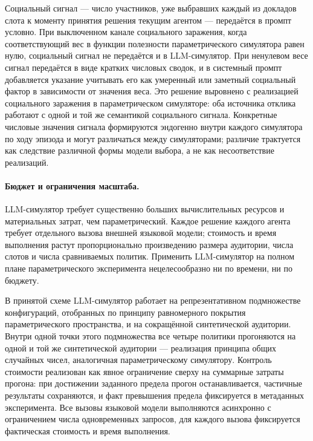 Социальный сигнал --- число участников, уже выбравших каждый из докладов слота к моменту принятия решения текущим агентом --- передаётся в промпт условно. При выключенном канале социального заражения, когда соответствующий вес в функции полезности параметрического симулятора равен нулю, социальный сигнал не передаётся и в LLM-симулятор. При ненулевом весе сигнал передаётся в виде кратких числовых сводок, и в системный промпт добавляется указание учитывать его как умеренный или заметный социальный фактор в зависимости от значения веса. Это решение выровнено с реализацией социального заражения в параметрическом симуляторе: оба источника отклика работают с одной и той же семантикой социального сигнала. Конкретные числовые значения сигнала формируются эндогенно внутри каждого симулятора по ходу эпизода и могут различаться между симуляторами; различие трактуется как следствие различной формы модели выбора, а не как несоответствие реализаций.

\paragraph{Бюджет и ограничения масштаба.}
LLM-симулятор требует существенно больших вычислительных ресурсов и материальных затрат, чем параметрический. Каждое решение каждого агента требует отдельного вызова внешней языковой модели; стоимость и время выполнения растут пропорционально произведению размера аудитории, числа слотов и числа сравниваемых политик. Применить LLM-симулятор на полном плане параметрического эксперимента нецелесообразно ни по времени, ни по бюджету.

В принятой схеме LLM-симулятор работает на репрезентативном подмножестве конфигураций, отобранных по принципу равномерного покрытия параметрического пространства, и на сокращённой синтетической аудитории. Внутри одной точки этого подмножества все четыре политики прогоняются на одной и той же синтетической аудитории --- реализация принципа общих случайных чисел, аналогичная параметрическому симулятору. Контроль стоимости реализован как явное ограничение сверху на суммарные затраты прогона: при достижении заданного предела прогон останавливается, частичные результаты сохраняются, и факт превышения предела фиксируется в метаданных эксперимента. Все вызовы языковой модели выполняются асинхронно с ограничением числа одновременных запросов, для каждого вызова фиксируется фактическая стоимость и время выполнения.

